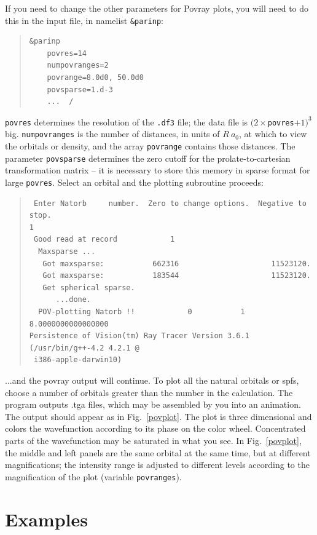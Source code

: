 \documentclass[10pt,leqno, oneside]{book}
\begin{document}
If you need to change the other parameters for Povray plots, you will need to do this in the input file, in namelist \verb#&parinp#:
{\small\begin{quote}
\begin{verbatim}
&parinp
    povres=14
    numpovranges=2
    povrange=8.0d0, 50.0d0
    povsparse=1.d-3
    ...  /
\end{verbatim}
\end{quote}}
\verb#povres# determines the resolution of the \verb#.df3# file; the data file is $(2 \times $\verb#povres#$ + 1)^3$ big.  \verb#numpovranges# is the number of distances, in units of $R \ a_0$, at which to view the orbitals or density, and the array \verb#povrange# contains those distances.  The parameter \verb#povsparse# determines the zero cutoff for the prolate-to-cartesian transformation matrix -- it is necessary to store this memory in sparse format for large \verb#povres#.  Select an orbital and the plotting subroutine proceeds:
{\small\begin{quote}
\begin{verbatim}
 Enter Natorb     number.  Zero to change options.  Negative to stop.
1
 Good read at record            1
  Maxsparse ... 
   Got maxsparse:           662316                     11523120.
   Got maxsparse:           183544                     11523120.
   Get spherical sparse.
      ...done.
  POV-plotting Natorb !!            0           1   8.0000000000000000     
Persistence of Vision(tm) Ray Tracer Version 3.6.1 (/usr/bin/g++-4.2 4.2.1 @
 i386-apple-darwin10)
\end{verbatim}
\end{quote}}
...and the povray output will continue.  To plot all the natural orbitals or spfs, choose a number of orbitals greater than the number in the calculation.  The program outputs .tga files, which may be assembled by you into an animation.  The output should appear as in Fig.~\ref{povplot}.  The plot is three dimensional and colors the wavefunction according to its phase on the color wheel.  Concentrated parts of the wavefunction may be saturated in what you see.  In Fig.~\ref{povplot}, the middle and left panels are the same orbital at the same time, but at different magnifications; the intensity range is adjusted to different levels according to the magnification of the plot (variable \verb#povranges#). 




\chapter{Examples}
\end{document}
